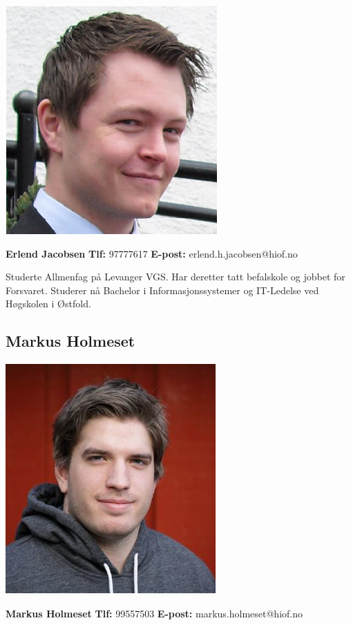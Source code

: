 \documentclass[norsk,a4paper,12pt]{article}
\begin{document}
\includegraphics[scale=0.5]{erlend.png}

\textbf{Erlend Jacobsen}\newline
\textbf{Tlf:} 97777617\newline
\textbf{E-post:} erlend.h.jacobsen@hiof.no\newline

Studerte Allmenfag på Levanger VGS. Har deretter tatt befalskole og jobbet for Forsvaret. Studerer nå Bachelor i Informasjonssystemer og IT-Ledelse ved Høgskolen i Østfold.

\subsection{Markus Holmeset}

\includegraphics[scale=0.5]{markus.png}

\textbf{Markus Holmeset}\newline
\textbf{Tlf:} 99557503\newline
\textbf{E-post:} markus.holmeset@hiof.no\newline
\end{document}

